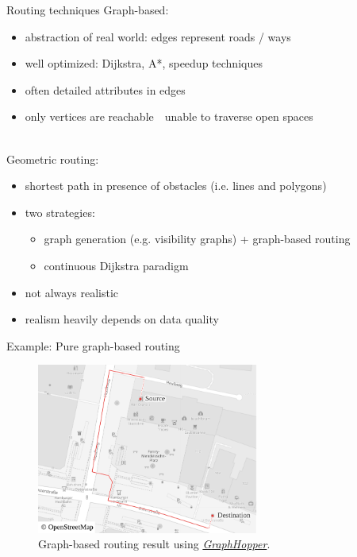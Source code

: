 \documentclass[xcolor={x11names}]{beamer}
\renewcommand{\n}{\hfill\\[0.5ex]}
\newcommand{\nn}{\hfill\\[2ex]}
\newenvironment{figcenter}
{%
	\parskip=0pt%
	\par%
	\nopagebreak%
	\centering%
}%
{%
	\par%
	\noindent%
	\ignorespacesafterend%
}
\begin{document}
		\begin{frame}{Routing techniques}
			Graph-based:\n
			\begin{itemize}
				\item abstraction of real world: edges represent roads / ways
				\item well optimized: Dijkstra, A*, speedup techniques
				\item often detailed attributes in edges
				\pause
				\item only vertices are reachable\ \textrightarrow\ unable to traverse open spaces
			\end{itemize}
			\nn
			\pause
			Geometric routing:\n
			\begin{itemize}
				\item shortest path in presence of obstacles (i.e. lines and polygons)
				\item two strategies:
				\begin{itemize}
					\item graph generation (e.g. visibility graphs) + graph-based routing
					\item continuous Dijkstra paradigm
				\end{itemize}
				\pause
				\item not always realistic
				\item realism heavily depends on data quality
			\end{itemize}
		\end{frame}
	
		\begin{frame}{Example: Pure graph-based routing}
			\begin{figure}[t]
				\begin{figcenter}
					\includegraphics[width=0.65\textwidth]{images/qgis-routing-osterstrasse_routing.pdf}
				\end{figcenter}
				\caption{Graph-based routing result using \href{https://www.osm.org/directions?engine=graphhopper\_foot\&route=53.57657,9.95210;53.57601,9.95268}{\emph{GraphHopper}}.}
			\end{figure}
		\end{frame}
		
\end{document}
